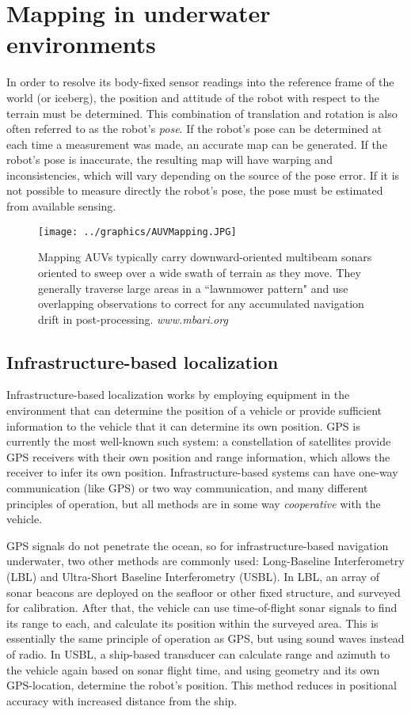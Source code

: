 \section{Mapping in underwater environments}

In order to resolve its body-fixed sensor readings into the reference frame of the world (or iceberg), the position and attitude of the robot with respect to the terrain must be determined. This combination of translation and rotation is also often referred to as the robot's \emph{pose}. If the robot's pose can be determined at each time a measurement was made, an accurate map can be generated. If the robot's pose is inaccurate, the resulting map will have warping and inconsistencies, which will vary depending on the source of the pose error. If it is not possible to measure directly the robot's pose, the pose must be estimated from available sensing. 

\begin{figure}[htbp]
   \centering
   \texttt{[image: ../graphics/AUVMapping.JPG]} %
   \caption{Mapping AUVs typically carry downward-oriented multibeam sonars oriented to sweep over a wide swath of terrain as they move. They generally traverse large areas in a ``lawnmower pattern" and use overlapping observations to correct for any accumulated navigation drift in post-processing. \emph{www.mbari.org} }
   \label{fig:AUVbathyMapping}
\end{figure}

\subsection{Infrastructure-based localization}

Infrastructure-based localization works by employing equipment in the environment that can determine the position of a vehicle or provide sufficient information to the vehicle that it can determine its own position. GPS is currently the most well-known such system: a constellation of satellites provide GPS receivers with their own position and range information, which allows the receiver to infer its own position. Infrastructure-based systems can have one-way communication (like GPS) or two way communication, and many different principles of operation, but all methods are in some way \emph{cooperative} with the vehicle. 

GPS signals do not penetrate the ocean, so for infrastructure-based navigation underwater, two other methods are commonly used: Long-Baseline Interferometry (LBL) and Ultra-Short Baseline Interferometry (USBL). In LBL, an array of sonar beacons are deployed on the seafloor or other fixed structure, and surveyed for calibration. After that, the vehicle can use time-of-flight sonar signals to find its range to each, and calculate its position within the surveyed area. This is essentially the same principle of operation as GPS, but using sound waves instead of radio. In USBL, a ship-based transducer can calculate range and azimuth to the vehicle again based on sonar flight time, and using geometry and its own GPS-location, determine the robot's position. This method reduces in positional accuracy with increased distance from the ship. 

